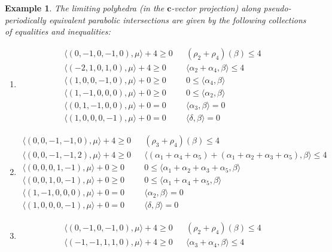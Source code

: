 \documentclass{amsart}
\newtheorem{example}[theorem]{Example}
\numberwithin{theorem}{section}
\newcommand{\bfc}{\boldsymbol{c}}
\begin{document}
\begin{example}
  The limiting polyhedra (in the $\bfc$-vector projection) along pseudo-periodically equivalent parabolic intersections are given by the following collections of equalities and inequalities:
  \begin{enumerate}
    \item 
      \begin{align*}
        \langle (0,-1, 0, -1, 0), \mu \rangle + 4 \geq 0 && (\rho_2+\rho_4)(\beta) \leq 4\\
        \langle (-2, 1, 0, 1, 0), \mu \rangle + 4 \geq 0 && \langle \alpha_2+\alpha_4, \beta \rangle \leq 4\\
        \langle (1, 0, 0, -1, 0), \mu \rangle + 0 \geq 0 && 0 \leq \langle \alpha_4, \beta \rangle\\
        \langle (1, -1, 0, 0, 0), \mu \rangle + 0 \geq 0 && 0 \leq \langle \alpha_2, \beta \rangle\\
        \langle (0, 1, -1, 0, 0), \mu \rangle + 0 = 0 && \langle \alpha_3, \beta \rangle = 0\\
        \langle (1, 0, 0, 0, -1), \mu \rangle + 0 = 0 && \langle \delta, \beta \rangle = 0
      \end{align*}
    \item 
      \begin{align*}
        \langle (0, 0, -1,-1, 0), \mu \rangle + 4 \geq 0 && (\rho_3+\rho_4)(\beta) \leq 4\\
        \langle (0, 0, -1,-1, 2), \mu \rangle + 4 \geq 0 && \langle (\alpha_1+\alpha_4+\alpha_5)+(\alpha_1+\alpha_2+\alpha_3+\alpha_5), \beta \rangle \leq 4\\
        \langle (0, 0, 0, 1, -1), \mu \rangle + 0 \geq 0 && 0 \leq \langle \alpha_1+\alpha_2+\alpha_3+\alpha_5, \beta \rangle\\
        \langle (0, 0, 1, 0, -1), \mu \rangle + 0 \geq 0 && 0 \leq \langle \alpha_1+\alpha_4+\alpha_5, \beta \rangle\\
        \langle (1, -1, 0, 0, 0), \mu \rangle + 0 = 0 && \langle \alpha_2, \beta \rangle = 0\\
        \langle (1, 0, 0, 0, -1), \mu \rangle + 0 = 0 && \langle \delta, \beta \rangle = 0
      \end{align*}
    \item 
      \begin{align*}
        \langle (0, -1, 0,-1, 0), \mu \rangle + 4 \geq 0 && (\rho_2+\rho_4)(\beta) \leq 4\\
        \langle (-1,-1, 1, 1, 0), \mu \rangle + 4 \geq 0 && \langle \alpha_3+\alpha_4, \beta \rangle \leq 4\\

\end{align*}
\end{enumerate}
\end{example}
\end{document}
